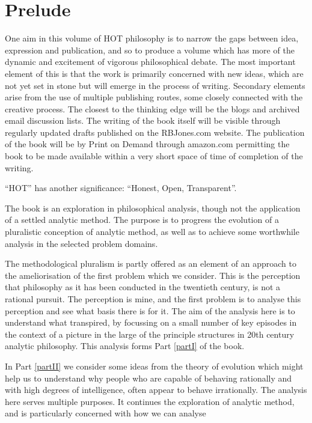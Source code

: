 \mainmatter
\def\rbjidprelude{$$Id: prelude.tex,v 1.5 2010/03/12 13:33:13 rbj Exp $$}

\chapter*{Prelude}\label{Prelude}

One aim in this volume of HOT philosophy is to narrow the gaps between idea, expression and publication, and so to produce a volume which has more of the dynamic and excitement of vigorous philosophical debate.
The most important element of this is that the work is primarily concerned with new ideas, which are not yet set in stone but will emerge in the process of writing.
Secondary elements arise from the use of multiple publishing routes, some closely connected with the creative process.
The closest to the thinking edge will be the blogs and archived email discussion lists.
The writing of the book itself will be visible through regularly updated drafts published on the RBJones.com website.
The publication of the book will be by Print on Demand through amazon.com permitting the book to be made available within a very short space of time of completion of the writing.

``HOT'' has another significance: ``Honest, Open, Transparent''.

The book is an exploration in philosophical analysis, though not the application of a settled analytic method.
The purpose is to progress the evolution of a pluralistic conception of analytic method, as well as to achieve some worthwhile analysis in the selected problem domains.

The methodological pluralism is partly offered as an element of an approach to the ameliorisation of the first problem which we consider.
This is the perception that philosophy as it has been conducted in the twentieth century, is not a rational pursuit.
The perception is mine, and the first problem is to analyse this perception and see what basis there is for it.
The aim of the analysis here is to understand what transpired, by focussing on a small number of key episodes in the context of a picture in the large of the principle structures in 20th century analytic philosophy.
This analysis forms Part \ref{partI} of the book.

In Part \ref{partII} we consider some ideas from the theory of evolution which might help us to understand why people who are capable of behaving rationally and with high degrees of intelligence, often appear to behave irrationally.
The analysis here serves multiple purposes.
It continues the exploration of analytic method, and is particularly concerned with how we can analyse 

